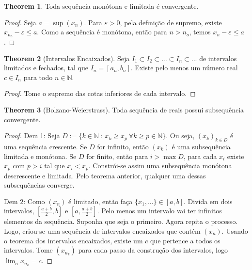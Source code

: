 \documentclass[10pt]{article}
\theoremstyle{definition}
\newtheorem{theorem}{Theorem}
\begin{document}
\begin{theorem}
	Toda sequência monótona e limitada é convergente.
\end{theorem}
\begin{proof}
	Seja $a = \sup (x_n)$. Para $\varepsilon > 0$, pela definição de supremo,
	existe $x_{n_o} - \varepsilon \leq a$. Como a sequência é monótona, então
	para $n>n_o$, temos $x_n - \varepsilon \leq a$.
\end{proof}
\begin{theorem}[Intervalos Encaixados]
	Seja $I_1 \subset I_2 \subset ... \subset I_n \subset ...$ de intervalos limitados e fechados,
	tal que $I_n = [a_n,b_n]$. Existe pelo menos um número real $c \in I_n$ para todo $n \in \mathbb N$.
\end{theorem}
\begin{proof}
	Tome o supremo das cotas inferiores de cada intervalo. 
\end{proof}


\begin{theorem}[Bolzano-Weierstrass]
	Toda sequência de reais possui subsequência convergente.
\end{theorem}
\begin{proof}
	Dem 1: Seja $D:=\{k \in \mathbb N \ : \ x_k \geq x_p \ \forall k \geq p \in \mathbb N \}$. Ou seja, $(x_k)_{k\in D}$ é
	uma sequência crescente. Se $D$ for infinito, então $(x_k)$ é uma subsequência limitada e monótona.
	Se $D$ for finito, então para $i > \max D$, para cada $x_i$ existe $x_p$ com $p > i$ tal que
	$x_i < x_p$. Constrói-se assim uma subsequência monótona descrescente e limitada. Pelo teorema anterior, qualquer
	uma dessas subsequências converge.

	Dem 2: Como $(x_n)$ é limitado, então faça $\{x_1,...\} \in [a,b]$. Divida em dois intervalos,
	$[\frac{a+b}{2},b]$ e $[a,\frac{a+b}{2}]$. Pelo menos um intervalo vai ter infinitos elementos da sequência.
	Suponha que seja o primeiro. Agora repita o processo. Logo, criou-se uma sequência de intervalos
	encaixados que contém $(x_n)$. Usando o teorema dos intervalos encaixados, existe um $c$ que pertence
	a todos os intervalos. Tome $(x_{n_k})$ para cada passo da construção dos intervalos, logo
	$\lim_n x_{n_k} = c$.
\end{proof}
\end{document}
